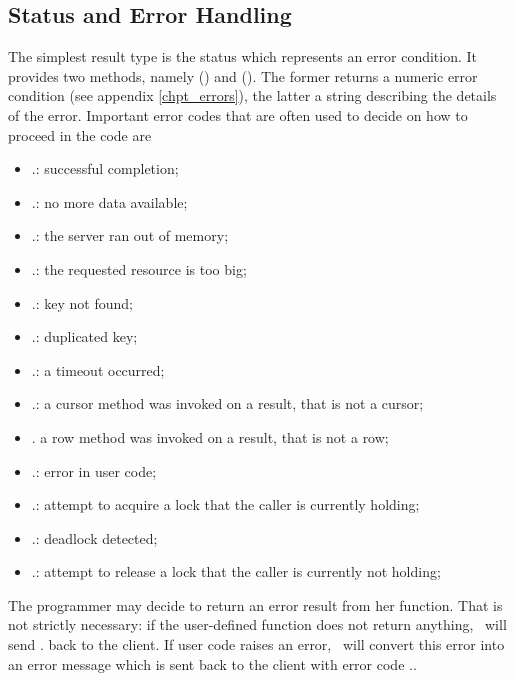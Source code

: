 \subsection{Status and Error Handling}
The simplest result type is
the status which represents an error condition.
It provides two methods, namely
() and ().
The former returns a numeric error condition (see appendix
\ref{chpt_errors}), the latter a string
describing the details of the error.
Important error codes that are often used to
decide on how to proceed in the code are

\begin{itemize}
\item {}.: successful completion;
\item {}.: no more data available;
\item {}.: the server ran out of memory;
\item {}.: the requested resource is too big;
\item {}.: key not found;
\item {}.: duplicated key;
\item {}.: a timeout occurred;
\item {}.: a cursor method was invoked on a result,
                            that is not a cursor;
\item {}. a row method was invoked on a result,
                            that is not a row;
\item {}.: error in user code;
\item {}.: attempt to acquire a lock that the caller
                             is currently holding;
\item {}.: deadlock detected;
\item {}.: attempt to release a lock that the caller
                              is currently not holding;
\end{itemize}

The programmer may decide to return an error result from
her function. That is not strictly necessary:
if the user-defined function does not return anything,
\nowdb\ will send . back to the client.
If user code raises an error, \nowdb\ will convert
this error into an error message which is sent back
to the client with error code ..

